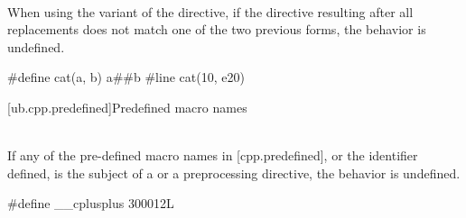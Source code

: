 \pnum
{} \\
When using the  variant of the  directive, if the directive resulting after all replacements does not match
one of the two previous forms, the behavior is undefined.

\pnum
\begin{example}
\begin{codeblock}
#define cat(a, b) a##b
#line cat(10, e20)
\end{codeblock}
\end{example}

[ub.cpp.predefined]{Predefined macro names}

\pnum
{} \\
If any of the pre-defined macro names in [cpp.predefined], or the identifier defined, is the subject of a 
or a  preprocessing directive, the behavior is undefined.

\pnum
\begin{example}
\begin{codeblock}
#define __cplusplus 300012L
\end{codeblock}
\end{example}
